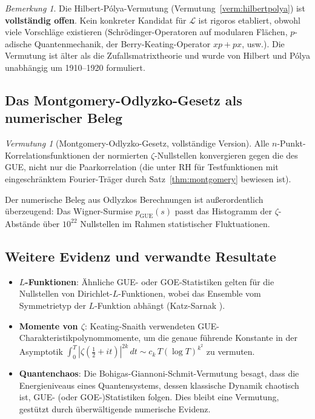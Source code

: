 \documentclass[12pt,a4paper]{amsart}
\theoremstyle{definition}
\theoremstyle{remark}
\newtheorem{bemerkung}[theorem]{Bemerkung}
\newtheorem{vermutung}[theorem]{Vermutung}
\begin{document}
\begin{bemerkung}
Die Hilbert-Pólya-Vermutung (Vermutung~\ref{verm:hilbertpolya}) ist
\textbf{vollständig offen}. Kein konkreter Kandidat für $\mathcal{L}$ ist
rigoros etabliert, obwohl viele Vorschläge existieren (Schrödinger-Operatoren
auf modularen Flächen, $p$-adische Quantenmechanik, der Berry-Keating-Operator
$xp + px$, usw.). Die Vermutung ist älter als die Zufallsmatrixtheorie und
wurde von Hilbert und Pólya unabhängig um 1910--1920 formuliert.
\end{bemerkung}

\subsection{Das Montgomery-Odlyzko-Gesetz als numerischer Beleg}

\begin{vermutung}[Montgomery-Odlyzko-Gesetz, vollständige Version]
\label{verm:moo}
Alle $n$-Punkt-Korrelationsfunktionen der normierten $\zeta$-Nullstellen
konvergieren gegen die des GUE, nicht nur die Paarkorrelation (die unter RH
für Testfunktionen mit eingeschränktem Fourier-Träger durch
Satz~\ref{thm:montgomery} bewiesen ist).
\end{vermutung}

Der numerische Beleg aus Odlyzkos Berechnungen \cite{Odlyzko1987, Odlyzko2001}
ist außerordentlich überzeugend: Das Wigner-Surmise $p_{\mathrm{GUE}}(s)$
passt das Histogramm der $\zeta$-Abstände über $10^{22}$ Nullstellen
im Rahmen statistischer Fluktuationen.

\subsection{Weitere Evidenz und verwandte Resultate}

\begin{itemize}
  \item \textbf{$L$-Funktionen}: Ähnliche GUE- oder GOE-Statistiken gelten
    für die Nullstellen von Dirichlet-$L$-Funktionen, wobei das Ensemble vom
    Symmetrietyp der $L$-Funktion abhängt (Katz-Sarnak \cite{KatzSarnak1999}).
  \item \textbf{Momente von $\zeta$}: Keating-Snaith \cite{KeatingSnaith2000}
    verwendeten GUE-Charakteristikpolynommomente, um die genaue führende Konstante
    in der Asymptotik $\int_0^T |\zeta(\frac{1}{2}+it)|^{2k}\,dt \sim c_k\,T(\log T)^{k^2}$
    zu vermuten.
  \item \textbf{Quantenchaos}: Die Bohigas-Giannoni-Schmit-Vermutung besagt,
    dass die Energieniveaus eines Quantensystems, dessen klassische Dynamik chaotisch ist,
    GUE- (oder GOE-)Statistiken folgen. Dies bleibt eine Vermutung, gestützt
    durch überwältigende numerische Evidenz.
\end{itemize}
\end{document}

